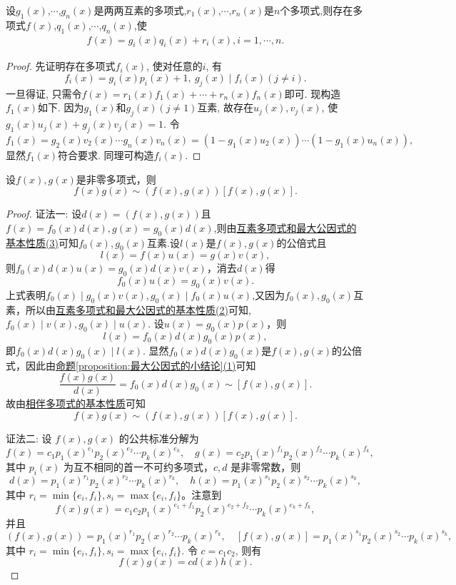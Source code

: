 \documentclass[lang=cn,newtx,10pt,scheme=chinese]{elegantbook}
\begin{document}
\begin{theorem}[中国剩余定理]\label{theorem:中国剩余定理}
设$g_1(x)$,$\cdots$,$g_n(x)$是两两互素的多项式,$r_1(x)$,$\cdots$,$r_n(x)$是$n$个多项式,则存在多项式$f(x)$,$q_1(x)$,$\cdots$,$q_n(x)$,使
\begin{align*}
f(x)=g_i(x)q_i(x)+r_i(x),i = 1,\cdots,n.  
\end{align*}
\end{theorem}
\begin{proof}
先证明存在多项式\(f_i(x)\), 使对任意的\(i\), 有
\[
f_i(x)=g_i(x)p_i(x)+1,\ g_j(x)\mid f_i(x)(j\neq i).
\]
一旦得证, 只需令\(f(x)=r_1(x)f_1(x)+\cdots+r_n(x)f_n(x)\)即可. 现构造\(f_1(x)\)如下. 因为\(g_1(x)\)和\(g_j(x)(j\neq 1)\)互素, 故存在\(u_j(x),v_j(x)\), 使\(g_1(x)u_j(x)+g_j(x)v_j(x)=1\). 令
\[
f_1(x)=g_2(x)v_2(x)\cdots g_n(x)v_n(x)=(1 - g_1(x)u_2(x))\cdots(1 - g_1(x)u_n(x)),
\]
显然\(f_1(x)\)符合要求. 同理可构造\(f_i(x)\). 
\end{proof}

\begin{proposition}[两个多项式的乘积与其最大公因式和最小公倍式的乘积相伴]\label{proposition:两个多项式的乘积与其最大公因式和最小公倍式的乘积相伴}
设\(f(x),g(x)\)是非零多项式，则
\[
f(x)g(x)\sim(f(x),g(x))[f(x),g(x)].
\]
\end{proposition}
\begin{proof}
{\color{blue}证法一:}
设\(d(x)=(f(x),g(x))\)且\(f(x)=f_0(x)d(x),g(x)=g_0(x)d(x)\),则由\hyperref[proposition:互素多项式和最大公因式的基本性质]{互素多项式和最大公因式的基本性质(3)}可知\(f_0(x),g_0(x)\)互素.设\(l(x)\)是\(f(x),g(x)\)的公倍式且
\[
l(x)=f(x)u(x)=g(x)v(x),
\]
则\(f_0(x)d(x)u(x)=g_0(x)d(x)v(x)\)，消去\(d(x)\)得
\[
f_0(x)u(x)=g_0(x)v(x).
\]
上式表明$f_0(x)\mid g_0(x)v(x),g_0(x)\mid f_0(x)u(x)$,又因为\(f_0(x),g_0(x)\)互素，所以由\hyperref[proposition:互素多项式和最大公因式的基本性质]{互素多项式和最大公因式的基本性质(2)}可知,\(f_0(x)\mid v(x),g_0(x)\mid u(x)\). 设\(u(x)=g_0(x)p(x)\)，则
\[
l(x)=f_0(x)d(x)g_0(x)p(x),
\]
即\(f_0(x)d(x)g_0(x)\mid l(x)\). 显然\(f_0(x)d(x)g_0(x)\)是\(f(x),g(x)\)的公倍式，因此由\hyperref[proposition:最大公因式的小结论]{命题\ref{proposition:最大公因式的小结论}(1)}可知
\[
\frac{f(x)g(x)}{d(x)}=f_0(x)d(x)g_0(x)\sim[f(x),g(x)].
\]
故由\hyperref[proposition:相伴多项式的基本性质]{相伴多项式的基本性质}可知
\[
f(x)g(x)\sim(f(x),g(x))[f(x),g(x)].
\]

{\color{blue}证法二:}
设 \(f(x), g(x)\) 的公共标准分解为
\[
f(x) = c_1 p_1(x)^{e_1}p_2(x)^{e_2} \cdots p_k(x)^{e_k}, \quad g(x) = c_2 p_1(x)^{f_1}p_2(x)^{f_2} \cdots p_k(x)^{f_k},
\]
其中 \(p_i(x)\) 为互不相同的首一不可约多项式，\(c, d\) 是非零常数，则
\[
d(x) = p_1(x)^{r_1}p_2(x)^{r_2} \cdots p_k(x)^{r_k}, \quad h(x) = p_1(x)^{s_1}p_2(x)^{s_2} \cdots p_k(x)^{s_k},
\]
其中 \(r_i = \min\{e_i, f_i\}, s_i = \max\{e_i, f_i\}\)。注意到
\[
f(x)g(x) = c_1c_2 p_1(x)^{e_1 + f_1}p_2(x)^{e_2 + f_2} \cdots p_k(x)^{e_k + f_k},
\]
并且
\[
(f(x), g(x)) = p_1(x)^{r_1}p_2(x)^{r_2} \cdots p_k(x)^{r_k}, \quad [f(x), g(x)] = p_1(x)^{s_1}p_2(x)^{s_2} \cdots p_k(x)^{s_k},
\]
其中 \(r_i = \min\{e_i, f_i\}, s_i = \max\{e_i, f_i\}\). 令 \(c = c_1c_2\), 则有
\[
f(x)g(x) = cd(x)h(x).
\]
\end{proof}
\end{document}
